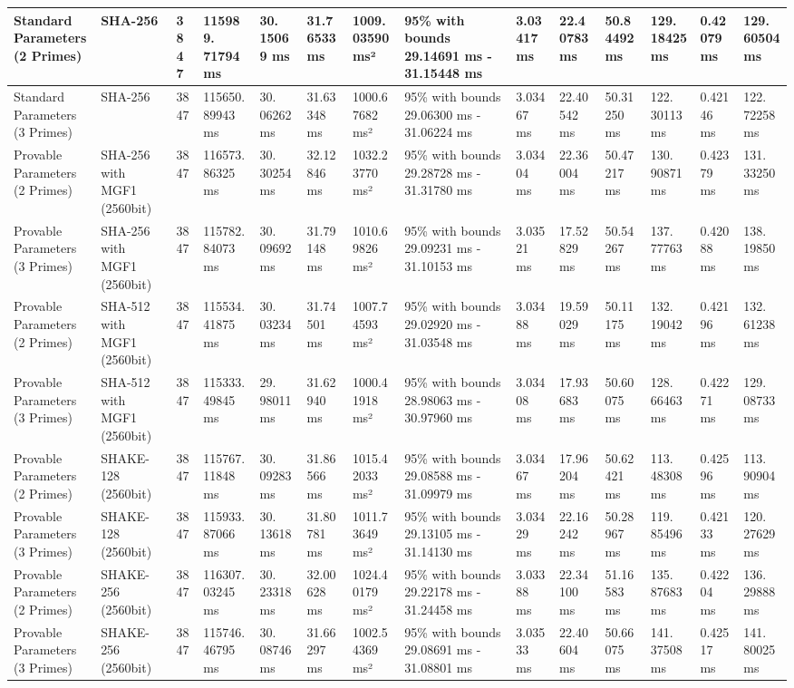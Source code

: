 \documentclass[]{final_report}
\theoremstyle{definition}
\begin{document}
\begin{landscape}
\begin{longtable}{|p{2.3cm}|p{1.8cm}|p{1.0cm}|p{1.7cm}|p{1.2cm}|p{1.5cm}|p{1.8cm}|p{1.5cm}|p{1.2cm}|p{1.5cm}|p{1.3cm}|p{1.2cm}|p{1.3cm}|p{1.3cm}|}
\hline
\endlastfoot
Standard Parameters (2 Primes) & SHA-256 & 3847 & 115989.
71794 ms & 30.
15069 ms & 31.76533 ms & 1009.03590 ms² & 95\% with bounds 29.14691 ms - 31.15448 ms & 3.03417 ms & 22.40783 ms & 50.84492 ms & 129.
18425 ms & 0.42079 ms & 129.
60504 ms \\
\hline
Standard Parameters (3 Primes) & SHA-256 & 3847 & 115650.
89943 ms & 30.
06262 ms & 31.63348 ms & 1000.67682 ms² & 95\% with bounds 29.06300 ms - 31.06224 ms & 3.03467 ms & 22.40542 ms & 50.31250 ms & 122.
30113 ms & 0.42146 ms & 122.
72258 ms \\
\hline
Provable Parameters (2 Primes) & SHA-256 with MGF1 (2560bit) & 3847 & 116573.
86325 ms & 30.
30254 ms & 32.12846 ms & 1032.23770 ms² & 95\% with bounds 29.28728 ms - 31.31780 ms & 3.03404 ms & 22.36004 ms & 50.47217 ms & 130.
90871 ms & 0.42379 ms & 131.
33250 ms \\
\hline
Provable Parameters (3 Primes) & SHA-256 with MGF1 (2560bit) & 3847 & 115782.
84073 ms & 30.
09692 ms & 31.79148 ms & 1010.69826 ms² & 95\% with bounds 29.09231 ms - 31.10153 ms & 3.03521 ms & 17.52829 ms & 50.54267 ms & 137.
77763 ms & 0.42088 ms & 138.
19850 ms \\
\hline
Provable Parameters (2 Primes) & SHA-512 with MGF1 (2560bit) & 3847 & 115534.
41875 ms & 30.
03234 ms & 31.74501 ms & 1007.74593 ms² & 95\% with bounds 29.02920 ms - 31.03548 ms & 3.03488 ms & 19.59029 ms & 50.11175 ms & 132.
19042 ms & 0.42196 ms & 132.
61238 ms \\
\hline
Provable Parameters (3 Primes) & SHA-512 with MGF1 (2560bit) & 3847 & 115333.
49845 ms & 29.
98011 ms & 31.62940 ms & 1000.41918 ms² & 95\% with bounds 28.98063 ms - 30.97960 ms & 3.03408 ms & 17.93683 ms & 50.60075 ms & 128.
66463 ms & 0.42271 ms & 129.
08733 ms \\
\hline
Provable Parameters (2 Primes) & SHAKE-128 (2560bit) & 3847 & 115767.
11848 ms & 30.
09283 ms & 31.86566 ms & 1015.42033 ms² & 95\% with bounds 29.08588 ms - 31.09979 ms & 3.03467 ms & 17.96204 ms & 50.62421 ms & 113.
48308 ms & 0.42596 ms & 113.
90904 ms \\
\hline
Provable Parameters (3 Primes) & SHAKE-128 (2560bit) & 3847 & 115933.
87066 ms & 30.
13618 ms & 31.80781 ms & 1011.73649 ms² & 95\% with bounds 29.13105 ms - 31.14130 ms & 3.03429 ms & 22.16242 ms & 50.28967 ms & 119.
85496 ms & 0.42133 ms & 120.
27629 ms \\
\hline
Provable Parameters (2 Primes) & SHAKE-256 (2560bit) & 3847 & 116307.
03245 ms & 30.
23318 ms & 32.00628 ms & 1024.40179 ms² & 95\% with bounds 29.22178 ms - 31.24458 ms & 3.03388 ms & 22.34100 ms & 51.16583 ms & 135.
87683 ms & 0.42204 ms & 136.
29888 ms \\
\hline
Provable Parameters (3 Primes) & SHAKE-256 (2560bit) & 3847 & 115746.
46795 ms & 30.
08746 ms & 31.66297 ms & 1002.54369 ms² & 95\% with bounds 29.08691 ms - 31.08801 ms & 3.03533 ms & 22.40604 ms & 50.66075 ms & 141.
37508 ms & 0.42517 ms & 141.
80025 ms \\
\hline


\end{longtable}
\end{landscape}
\end{document}
